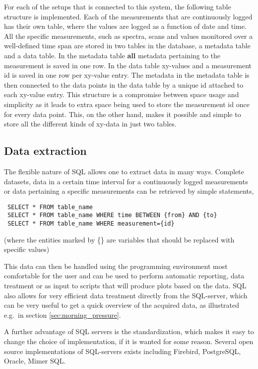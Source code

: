 For each of the setups that is connected to this system, the following table
structure is implemented. Each of the measurements that are continuously logged
has their own table, where the values are logged as a function of date and
time. All the specific measurements, such as spectra, scans and values
monitored over a well-defined time span are stored in two tables in the
database, a metadata table and a data table. In the metadata table \textbf{all}
metadata pertaining to the measurement is saved in one row. In the data table
xy-values and a measurement id is saved in one row per xy-value entry. The
metadata in the metadata table is then connected to the data points in the data
table by a unique id attached to each xy-value entry. This structure is a
compromise between space usage and simplicity as it leads to extra space being
used to store the measurement id once for every data point. This, on the other
hand, makes it possible and simple to store all the different kinds of xy-data
in just two tables.

\subsection{Data extraction} \label{sec:data_extraction}

The flexible nature of SQL allows one to extract data in many ways. Complete
datasets, data in a certain time interval for a continuously logged
measurements or data pertaining a specific measurements can be retrieved by
simple statements, 
\begin{verbatim}
 SELECT * FROM table_name
 SELECT * FROM table_name WHERE time BETWEEN {from} AND {to}
 SELECT * FROM table_name WHERE measurement={id}
\end{verbatim}
(where the entities marked by \{\} are variables that should be
replaced with specific values)

This data can then be handled using the programming environment most
comfortable for the user and can be used to perform automatic reporting, data
treatment or as input to scripts that will produce plots based on the data. SQL
also allows for very efficient data treatment directly from the SQL-server,
which can be very useful to get a quick overview of the acquired data, as
illustrated e.g.\ in section \ref{sec:morning_pressure}.

A further advantage of SQL servers is the standardization, which makes it easy
to change the choice of implementation, if it is wanted for some reason.
Several open source implementations of SQL-servers exists including Firebird,
PostgreSQL, Oracle, Mimer SQL.
